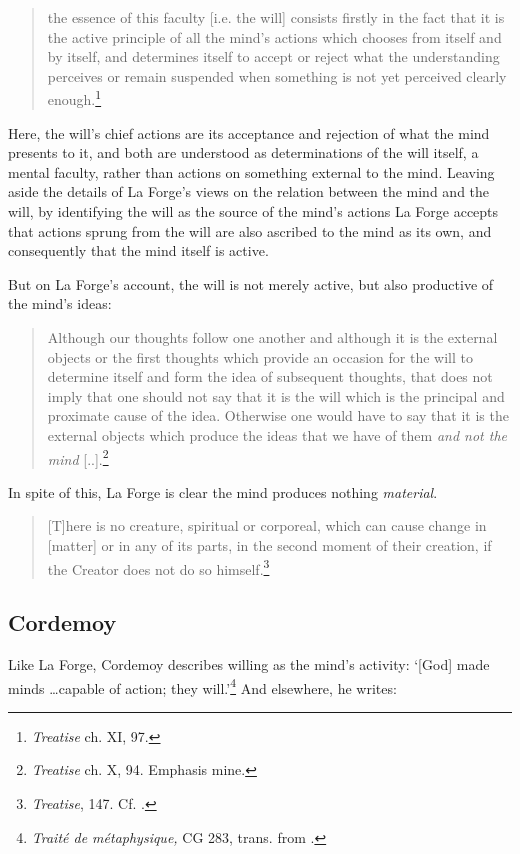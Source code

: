 \begin{quote}
	the essence of this faculty [i.e. the will] consists firstly in the fact that it is the active principle of all the mind's actions which chooses from itself and by itself, and determines itself to accept or reject what the understanding perceives or remain suspended when something is not yet perceived clearly enough.\footnote{\emph{Treatise} ch. XI, 97.}
\end{quote}

Here, the will's chief actions are its acceptance and rejection of what the mind presents to it, and both are understood as determinations of the will itself, a mental faculty, rather than actions on something external to the mind. Leaving aside the details of La Forge's views on the relation between the mind and the will, by identifying the will as the source of the mind's actions La Forge accepts that actions sprung from the will are also ascribed to the mind as its own, and consequently that the mind itself is active.

But on La Forge's account, the will is not merely active, but also productive of the mind's ideas:

\begin{quote}
	Although our thoughts follow one another and although it is the external objects or the first thoughts which provide an occasion for the will to determine itself and form the idea of subsequent thoughts, that does not imply that one should not say that it is the will which is the principal and proximate cause of the idea. Otherwise one would have to say that it is the external objects which produce the ideas that we have of them \emph{and not the mind} {[}..{]}.\footnote{\emph{Treatise} ch. X, 94. Emphasis mine.}
\end{quote}

In spite of this, La Forge is clear the mind produces nothing \emph{material}.

\begin{quote}
	[T]here is no creature, spiritual or corporeal, which can cause change in [matter] or in any of its parts, in the second moment of their creation, if the Creator does not do so himself.\footnote{\emph{Treatise}, 147. Cf. \autocite{Klima1993}.}
\end{quote}

\subsection{Cordemoy}
Like La Forge, Cordemoy describes willing as the mind's activity: `{[}God{]} made minds \ldots capable of action; they will.'\footnote{\emph{Traité de métaphysique,} CG 283, trans. from \autocite[52]{Nadler2005}.} And elsewhere, he writes:
	
